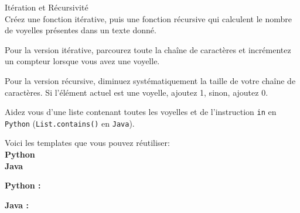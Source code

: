 \begin{Exercice}[15 minutes] Itération et Récursivité\\

Créez une fonction itérative, puis une fonction récursive qui calculent le nombre de voyelles présentes dans un texte donné. \\

\begin{conseil}
   Pour la version itérative, parcourez toute la chaîne de caractères et incrémentez un compteur lorsque vous avez une voyelle.
   
   Pour la version récursive, diminuez systématiquement la taille de votre chaîne de caractères. Si l'élément actuel est une voyelle, ajoutez 1, sinon, ajoutez 0.
   
   Aidez vous d'une liste contenant toutes les voyelles et de l'instruction \lstinline{in} en \lstinline{Python} (\lstinline{List.contains()} en \lstinline{Java}).
\end{conseil}

Voici les templates que vous pouvez réutiliser: \\

\textbf{Python} \\

     

\textbf{Java} \\

    

    
\begin{solution}
\textbf{Python :} \\

    
    
\end{solution}


\begin{solution}   
\textbf{Java :} \\

    
\end{solution}

\end{Exercice}

